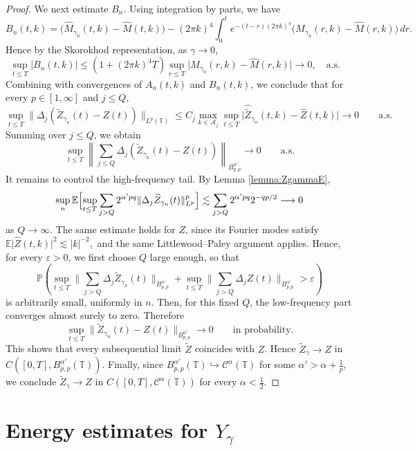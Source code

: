 \documentclass{article}
\begin{document}
\begin{proof}
We next estimate \(B_n\). Using integration by parts, we have
\[
B_n(t,k)
=
\bigl(\widehat M_{\gamma_n}(t,k)-\widehat M(t,k)\bigr)
-
(2\pi k)^4
\int_0^t
e^{-(t-r)(2\pi k)^4}
\bigl(\widehat M_{\gamma_n}(r,k)-\widehat M(r,k)\bigr)\,dr.
\]
Hence by the Skorokhod representation, as $\gamma \to 0$,
\[
\sup_{t\le T}|B_n(t,k)|
\le
\left(1+(2\pi k)^4T\right)
\sup_{r\le T}
\bigl|
\widehat M_{\gamma_n}(r,k)-\widehat M(r,k)
\bigr| \to 0, \quad \text{a.s.} \quad 
\]
Combining with convergences of $A_n(t,k)$ and $B_n(t,k)$, we conclude that for every \(p\in[1,\infty]\) and \(j \le Q\),
\[
\sup_{t\le T}
\|\Delta_j(\widetilde Z_{\gamma_n}(t)-Z(t))\|_{L^p(\mathbb T)}
\le
C_j
\max_{k\in\mathcal A_j}
\sup_{t\le T}
\bigl|
\widehat{\widetilde Z}_{\gamma_n}(t,k)-\widehat Z(t,k)
\bigr|
\longrightarrow0
\qquad\text{a.s.}
\]
Summing over \(j \le Q\), we obtain
\[
\sup_{t\le T}
\left\|
\sum_{j \le Q}\Delta_j(\widetilde Z_{\gamma_n}(t)-Z(t))
\right\|_{B^{\alpha'}_{p,p}}
\rightarrow0
\qquad\text{a.s.}
\]
It remains to control the high-frequency tail.
By Lemma \ref{lemma:ZgammaE},
\[
\sup_n
\mathbb E
\Bigl[
\sup_{t\le T}
\sum_{j>Q}2^{\alpha' pq}\|\Delta_j\widetilde Z_{\gamma_n}(t)\|_{L^p}^p
\Bigr]
\lesssim
\sum_{j>Q}2^{\alpha' pq}2^{-qp/2}\longrightarrow0
\]
as \(Q\to\infty\).
The same estimate holds for \(Z\), since its Fourier modes satisfy
\(
\mathbb E\bigl|\widehat Z(t,k)\bigr|^2
\lesssim |k|^{-2},
\)
and the same Littlewood--Paley argument applies.
Hence, for every \(\varepsilon>0\), we first choose \(Q\) large enough, so that
\[
\mathbb P\!\left(
\sup_{t\le T} \big\|\sum_{j>Q}\Delta_j\widetilde Z_{\gamma_n}(t)
\big\|_{B^{\alpha'}_{p,p}} + \sup_{t\le T}
\big\|\sum_{j>Q}\Delta_j Z(t) \big\|_{B^{\alpha'}_{p,p}} > \varepsilon
\right)
\]
is arbitrarily small, uniformly in \(n\). Then, for this fixed \(Q\), the low-frequency part converges almost surely to zero.
Therefore
\[
\sup_{t\le T}\|\widetilde Z_{\gamma_n}(t)-Z(t)\|_{B^{ \alpha'}_{p,p}}
\rightarrow0
\qquad\text{in probability.}
\]
This shows that every subsequential limit \(\widetilde Z\) coincides with \(Z\).
Hence
\(
\widetilde Z_\gamma\rightarrow Z\) in \(C([0,T],B^{\alpha'}_{p,p}(\mathbb T)).
\)
Finally, since
\(
B^{\alpha'}_{p,p}(\mathbb T)\hookrightarrow \mathcal C^\alpha(\mathbb T)
\)
for some $\alpha'>\alpha+\frac1p$,
we conclude
$\widetilde Z_\gamma \rightarrow Z$ in $C([0,T],\mathcal C^\alpha(\mathbb T))$
for every \(\alpha<\frac12\).
\end{proof}


\section{Energy estimates for $Y_{\gamma}$}
\label{subsec:energy-estimates}
\end{document}
